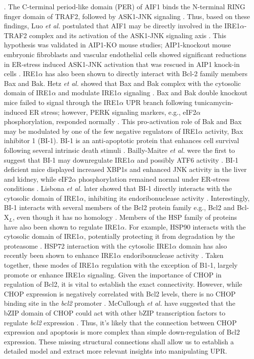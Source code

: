\documentclass[12pt]{article}
\begin{document}
\cite{Luo:2008ly}. The C-terminal period-like domain (PER) of AIF1 binds the N-terminal RING finger domain of TRAF2, followed by ASK1-JNK signaling \cite{Zhang:2004ve}. Thus, based on these findings, Luo \emph{et al.} postulated that AIF1 may be directly involved in the IRE1$\alpha$-TRAF2 complex and its activation of the ASK1-JNK signaling axis \cite{Luo:2008ly}. This hypothesis was validated in AIP1-KO mouse studies; AIP1-knockout mouse embryonic fibroblasts and vascular endothelial cells showed significant reductions in ER-stress induced ASK1-JNK activation that was rescued in AIP1 knock-in cells \cite{Luo:2008ly}. IRE1$\alpha$ has also been shown to directly interact with Bcl-2 family members Bax and Bak. Hetz \emph{et al.} showed that Bax and Bak complex with the cytosolic domain of IRE1$\alpha$ and modulate IRE1$\alpha$ signaling \cite{Hetz:2006qf}. Bax and Bak double knockout mice failed to signal through the IRE1$\alpha$ UPR branch following tunicamycin-induced ER stress; however, PERK signaling markers, e.g., eIF2$\alpha$ phosphorylation, responded normally \cite{Hetz:2006qf}. This pro-activation role of Bak and Bax may be modulated by one of the few negative regulators of IRE1$\alpha$ activity, Bax inhibitor 1 (BI-1). BI-1 is an anti-apoptotic protein that enhances cell survival following several intrinsic death stimuli \cite{Xu:1998dq}. Bailly-Maitre \emph{et al.} were the first to suggest that BI-1 may downregulate IRE1$\alpha$ and possibly ATF6 activity \cite{Bailly-Maitre:2006bh}. BI-1 deficient mice displayed increased XBP1s and enhanced JNK activity in the liver and kidney, while eIF2$\alpha$ phosphorylation remained normal under ER-stress conditions \cite{Bailly-Maitre:2006bh}. Lisbona \emph{et al.} later showed that BI-1 directly interacts with the cytosolic domain of IRE1$\alpha$, inhibiting its endoribonuclease activity \cite{Lisbona:2009cr}. Interestingly, BI-1 interacts with several members of the Bcl2 protein family e.g., Bcl2 and Bcl-X$_{L}$, even though it has no homology \cite{Xu:1998dq}. Members of the HSP family of proteins have also been shown to regulate IRE1$\alpha$. For example, HSP90 interacts with the cytosolic domain of IRE1$\alpha$, potentially protecting it from degradation by the proteasome \cite{Marcu:2002oq}. HSP72 interaction with the cytosolic IRE1$\alpha$ domain has also recently been shown to enhance IRE1$\alpha$ endoribonuclease activity \cite{Gupta:2010kl}. Taken together, these modes of IRE1$\alpha$ regulation with the exception of B1-1, largely promote or enhance IRE1$\alpha$ signaling. Given the importance of CHOP in regulation of Bcl2, it is vital to establish the exact connectivity. However, while CHOP expression is negatively correlated with Bcl2 levels, there is no CHOP binding site in the \emph{bcl2} promoter \cite{mccullough2001gsc}. McCullough \emph{et al.} have suggested that the bZIP domain of CHOP could act with other bZIP transcription factors to regulate \emph{bcl2} expression \cite{mccullough2001gsc}. Thus, it's likely that the connection between CHOP expression and apoptosis is more complex than simple down-regulation of Bcl2 expression. These missing structural connections shall allow us to establish a detailed model and extract more relevant insights into manipulating UPR. 


\clearpage
% 


\end{document}
